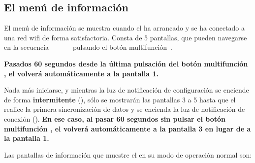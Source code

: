 \subsection{El menú de información}

El menú de información se muestra cuando el \MIE ha arrancado y se ha conectado a una red wifi de forma satisfactoria. Consta de 5 pantallas, que pueden navegarse en la secuencia
~~~
~~
pulsando el botón multifunción~.

\textbf{Pasados 60 segundos desde la última pulsación del botón multifunción , el \MI volverá automáticamente a la pantalla 1.}

Nada más iniciarse, y mientras la luz de notificación de configuración  se enciende de forma \textbf{intermitente} (), sólo se mostrarán las pantallas 3 a 5 hasta que el \ME realice la primera sincronización de datos y se encienda la luz de notificación de conexión  (). \textbf{En ese caso, al pasar 60 segundos sin pulsar el botón multifunción , el \MI volverá automáticamente a la pantalla 3 en lugar de a la pantalla 1.}
\attend

Las pantallas de información que muestre el \MIE en su modo de operación normal son:

